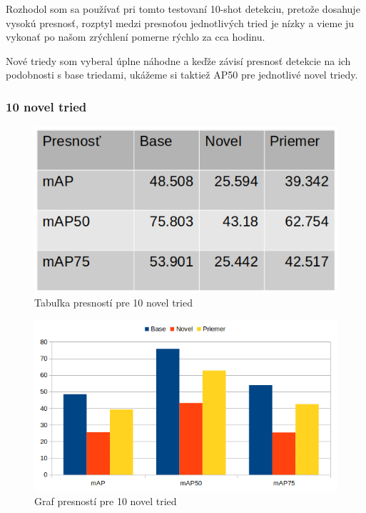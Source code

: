 Rozhodol som sa používať pri tomto testovaní 10-shot detekciu, pretože dosahuje  vysokú presnosť, rozptyl medzi presnoťou jednotlivých tried je nízky a vieme ju vykonať po našom zrýchlení pomerne rýchlo za cca hodinu. 

Nové triedy som vyberal úplne náhodne a keďže závisí presnosť detekcie na ich podobnosti s base triedami, ukážeme si taktiež AP50 pre jednotlivé novel triedy.

\subsubsection{10 novel tried}

\begin{figure}[H]
\centering
\includegraphics[width=\textwidth]{images/10novel_table.png}
\caption{Tabuľka presností pre 10 novel tried}
\label{fig:image60}
\end{figure}

\begin{figure}[H]
\centering
\includegraphics[width=\textwidth]{images/10novel_chart.png}
\caption{Graf presností pre 10 novel tried}
\label{fig:image61}
\end{figure}

